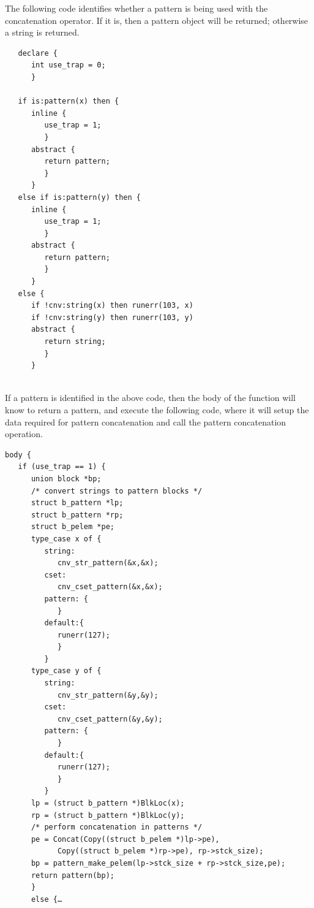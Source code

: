 \documentclass{article}
\begin{document}
The following code identifies whether a pattern is being used with the concatenation operator.  If it is, then a pattern object will be returned; otherwise a string is returned.\\
\begin{verbatim}
   declare {
      int use_trap = 0;
      }

   if is:pattern(x) then {
      inline {
         use_trap = 1;
         }
      abstract {
         return pattern;
         }
      }
   else if is:pattern(y) then {
      inline {
         use_trap = 1;
         }
      abstract {
         return pattern;
         }
      }
   else {
      if !cnv:string(x) then runerr(103, x)
      if !cnv:string(y) then runerr(103, y)
      abstract {
         return string;
         }
      }
      
\end{verbatim}
If a pattern is identified in the above code, then the body of the function will know to return a pattern, and execute the following code, where it will setup the data required for pattern concatenation and call the pattern concatenation operation.\\
\begin{verbatim}
body {
   if (use_trap == 1) {
      union block *bp;
      /* convert strings to pattern blocks */
      struct b_pattern *lp;
      struct b_pattern *rp;
      struct b_pelem *pe;
      type_case x of {
         string:
            cnv_str_pattern(&x,&x);
         cset:
            cnv_cset_pattern(&x,&x);
         pattern: {
            }
         default:{
            runerr(127);
            }
         }
      type_case y of {
         string:
            cnv_str_pattern(&y,&y);
         cset:
            cnv_cset_pattern(&y,&y);
         pattern: {
            }
         default:{
            runerr(127);
            }
         }
      lp = (struct b_pattern *)BlkLoc(x);
      rp = (struct b_pattern *)BlkLoc(y);
      /* perform concatenation in patterns */
      pe = Concat(Copy((struct b_pelem *)lp->pe), 
            Copy((struct b_pelem *)rp->pe), rp->stck_size);
      bp = pattern_make_pelem(lp->stck_size + rp->stck_size,pe);
      return pattern(bp);
      }
      else {…
\end{verbatim}
\end{document}
